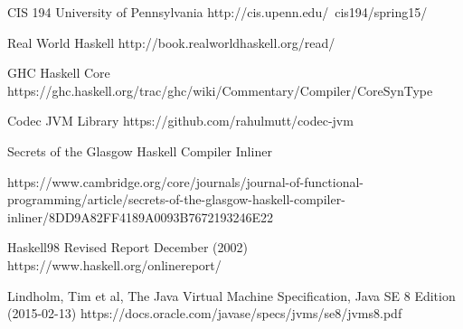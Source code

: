 \documentclass[a4paper]{article}
\begin{document}
  \begin{thebibliography}{}
    CIS 194 University of Pennsylvania
    http://cis.upenn.edu/~cis194/spring15/

    Real World Haskell
    http://book.realworldhaskell.org/read/

    GHC Haskell Core
    https://ghc.haskell.org/trac/ghc/wiki/Commentary/Compiler/CoreSynType

    Codec JVM Library
    https://github.com/rahulmutt/codec-jvm

    Secrets of the Glasgow Haskell Compiler Inliner

    https://www.cambridge.org/core/journals/journal-of-functional-programming/article/secrets-of-the-glasgow-haskell-compiler-inliner/8DD9A82FF4189A0093B7672193246E22

    Haskell98 Revised Report December (2002)
    https://www.haskell.org/onlinereport/

    \begin{flushleft}
      Lindholm, Tim et al,
      The Java Virtual Machine Specification, Java SE 8 Edition (2015-02-13)
      https://docs.oracle.com/javase/specs/jvms/se8/jvms8.pdf
    \end{flushleft}


  \end{thebibliography}
\end{document}

